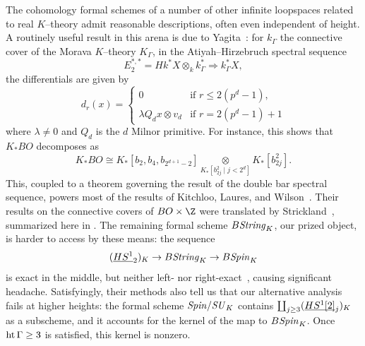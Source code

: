 \begin{remark}
The cohomology formal schemes of a number of other infinite loopspaces related to real \(K\)--theory admit reasonable descriptions, often even independent of height.
A routinely useful result in this arena is due to Yagita~\cite[Lemma 2.1]{Yagita}: for \(k_\Gamma\) the connective cover of the Morava \(K\)--theory \(K_\Gamma\), in the Atiyah--Hirzebruch spectral sequence \[E_2^{*, *} = Hk^* X \otimes_k k_\Gamma^* \Rightarrow k_\Gamma^* X,\] the differentials are given by \[d_r(x) = \begin{cases} 0 & \text{if \(r \le 2(p^d - 1)\)}, \\ \lambda Q_d x \otimes v_d & \text{if \(r = 2(p^d - 1) + 1\)} \end{cases}\] where \(\lambda \ne 0\) and \(Q_d\) is the \(d\){\th} Milnor primitive.
For instance, this shows that \(K_* BO\) decomposes as \[K_* BO \cong K_*[b_2, b_4, b_{2^{d+1}-2}] \underset{K_*[b_{2j}^2 \mid j < 2^d]}{\otimes} K_*[b_{2j}^2].\]
This, coupled to a theorem governing the result of the double bar spectral sequence, powers most of the results of Kitchloo, Laures, and Wilson~\cite[Section 4]{KLW}.
Their results on the connective covers of \(BO \times \Z\) were translated by Strickland~\cite{StricklandFSKS}, summarized here in .
The remaining formal scheme \(B\mathit{String}_K\), our prized object, is harder to access by these means: the sequence \[(\OS{HS^1}{2})_K \to B\String_K \to B\Spin_K\] is exact in the middle, but neither left- nor right-exact~\cite[pg.\ 234]{KLW}, causing significant headache.
Satisfyingly, their methods also tell us that our alternative analysis fails at higher heights: the formal scheme \(\mathit{Spin}/\mathit{SU}_K\) contains \(\coprod_{j \ge 3} (\OS{HS^1[2]}{j})_K\) as a subscheme, and it accounts for the kernel of the map to \(B\mathit{Spin}_K\).
Once \(\operatorname{ht} \Gamma \ge 3\) is satisfied, this kernel is nonzero.
\end{remark}

